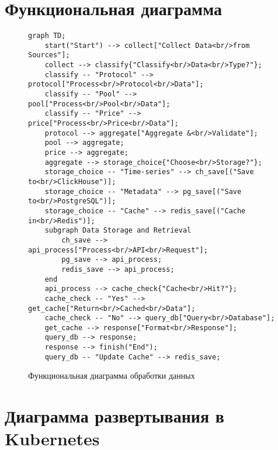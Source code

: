 \documentclass[11pt,a4paper]{article}
\begin{document}
\section{Функциональная диаграмма}

\begin{figure}[H]
\centering
\begin{verbatim}
graph TD;
    start("Start") --> collect["Collect Data<br/>from Sources"];
    collect --> classify{"Classify<br/>Data<br/>Type?"};
    classify -- "Protocol" --> protocol["Process<br/>Protocol<br/>Data"];
    classify -- "Pool" --> pool["Process<br/>Pool<br/>Data"];
    classify -- "Price" --> price["Process<br/>Price<br/>Data"];
    protocol --> aggregate["Aggregate &<br/>Validate"];
    pool --> aggregate;
    price --> aggregate;
    aggregate --> storage_choice{"Choose<br/>Storage?"};
    storage_choice -- "Time-series" --> ch_save[("Save to<br/>ClickHouse")];
    storage_choice -- "Metadata" --> pg_save[("Save to<br/>PostgreSQL")];
    storage_choice -- "Cache" --> redis_save[("Cache in<br/>Redis")];
    subgraph Data Storage and Retrieval
        ch_save --> api_process["Process<br/>API<br/>Request"];
        pg_save --> api_process;
        redis_save --> api_process;
    end
    api_process --> cache_check{"Cache<br/>Hit?"};
    cache_check -- "Yes" --> get_cache["Return<br/>Cached<br/>Data"];
    cache_check -- "No" --> query_db["Query<br/>Database"];
    get_cache --> response["Format<br/>Response"];
    query_db --> response;
    response --> finish("End");
    query_db -- "Update Cache" --> redis_save;
\end{verbatim}
\caption{Функциональная диаграмма обработки данных}
\label{fig:functional-diagram}
\end{figure}

\section{Диаграмма развертывания в Kubernetes}
\end{document}
